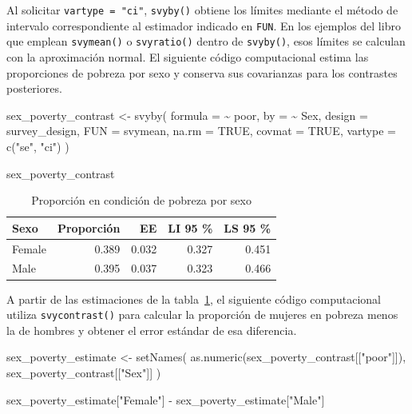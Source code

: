 \documentclass[
  spanish,
  11pt,
  letterpaper,
  oneside,
  open=any]{scrbook}
\newenvironment{Shaded}{\begin{snugshade}}{\end{snugshade}}
\newcommand{\AttributeTok}[1]{\textcolor[rgb]{0.40,0.45,0.13}{#1}}
\newcommand{\ConstantTok}[1]{\textcolor[rgb]{0.56,0.35,0.01}{#1}}
\newcommand{\FunctionTok}[1]{\textcolor[rgb]{0.28,0.35,0.67}{#1}}
\newcommand{\NormalTok}[1]{\textcolor[rgb]{0.00,0.23,0.31}{#1}}
\newcommand{\OtherTok}[1]{\textcolor[rgb]{0.00,0.23,0.31}{#1}}
\newcommand{\SpecialCharTok}[1]{\textcolor[rgb]{0.37,0.37,0.37}{#1}}
\newcommand{\StringTok}[1]{\textcolor[rgb]{0.13,0.47,0.30}{#1}}
\begin{document}
Al solicitar \texttt{vartype\ =\ "ci"}, \texttt{svyby()} obtiene los
límites mediante el método de intervalo correspondiente al estimador
indicado en \texttt{FUN}. En los ejemplos del libro que emplean
\texttt{svymean()} o \texttt{svyratio()} dentro de \texttt{svyby()},
esos límites se calculan con la aproximación normal. El siguiente código
computacional estima las proporciones de pobreza por sexo y conserva sus
covarianzas para los contrastes posteriores.

\begin{Shaded}
\begin{Highlighting}[]
\NormalTok{sex\_poverty\_contrast }\OtherTok{\textless{}{-}} \FunctionTok{svyby}\NormalTok{(}
  \AttributeTok{formula =} \SpecialCharTok{\textasciitilde{}}\NormalTok{ poor,}
  \AttributeTok{by =} \SpecialCharTok{\textasciitilde{}}\NormalTok{ Sex,}
  \AttributeTok{design =}\NormalTok{ survey\_design,}
  \AttributeTok{FUN =}\NormalTok{ svymean,}
  \AttributeTok{na.rm =} \ConstantTok{TRUE}\NormalTok{,}
  \AttributeTok{covmat =} \ConstantTok{TRUE}\NormalTok{,}
  \AttributeTok{vartype =} \FunctionTok{c}\NormalTok{(}\StringTok{"se"}\NormalTok{, }\StringTok{"ci"}\NormalTok{)}
\NormalTok{)}

\NormalTok{sex\_poverty\_contrast}
\end{Highlighting}
\end{Shaded}

{

\begin{longtable}[]{@{}lrrrr@{}}

\caption{\label{tbl-svyby-pobreza-sexo2}Proporción en condición de
pobreza por sexo}

\tabularnewline

\toprule\noalign{}
Sexo & Proporción & EE & LI 95 \% & LS 95 \% \\
\midrule\noalign{}
\endhead
\bottomrule\noalign{}
\endlastfoot
Female & 0.389 & 0.032 & 0.327 & 0.451 \\
Male & 0.395 & 0.037 & 0.323 & 0.466 \\

\end{longtable}

}

A partir de las estimaciones de la tabla~\ref{tbl-svyby-pobreza-sexo2},
el siguiente código computacional utiliza \texttt{svycontrast()} para
calcular la proporción de mujeres en pobreza menos la de hombres y
obtener el error estándar de esa diferencia.

\begin{Shaded}
\begin{Highlighting}[]
\NormalTok{sex\_poverty\_estimate }\OtherTok{\textless{}{-}} \FunctionTok{setNames}\NormalTok{(}
  \FunctionTok{as.numeric}\NormalTok{(sex\_poverty\_contrast[[}\StringTok{"poor"}\NormalTok{]]),}
\NormalTok{  sex\_poverty\_contrast[[}\StringTok{"Sex"}\NormalTok{]]}
\NormalTok{)}

\NormalTok{sex\_poverty\_estimate[}\StringTok{"Female"}\NormalTok{] }\SpecialCharTok{{-}}\NormalTok{ sex\_poverty\_estimate[}\StringTok{"Male"}\NormalTok{]}
\end{Highlighting}
\end{Shaded}
\end{document}
